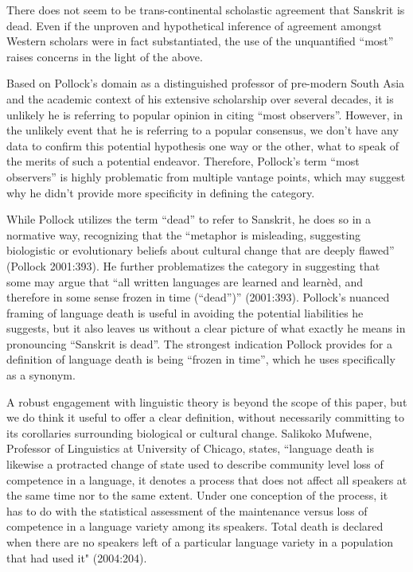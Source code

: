 There does not seem to be trans-continental scholastic agreement that Sanskrit is dead. Even if the unproven and hypothetical inference of agreement amongst Western scholars were in fact substantiated, the use of the unquantified “most” raises concerns in the light of the above. 

Based on Pollock’s domain as a distinguished professor of pre-modern South Asia and the academic context of his extensive scholarship over several decades, it is unlikely he is referring to popular opinion in citing “most observers”. However, in the unlikely event that he is referring to a popular consensus, we don’t have any data to confirm this potential hypothesis one way or the other, what to speak of the merits of such a potential endeavor. Therefore, Pollock’s term “most observers” is highly problematic from multiple vantage points, which may suggest why he didn’t provide more specificity in defining the category. 

While Pollock utilizes the term “dead” to refer to Sanskrit, he does so in a normative way, recognizing that the “metaphor is misleading, suggesting biologistic or evolutionary beliefs about cultural change that are deeply flawed” (Pollock 2001:393). He further problematizes the category in suggesting that some may argue that “all written languages are learned and learnèd, and therefore in some sense frozen in time (“dead”)” (2001:393). Pollock’s nuanced framing of language death is useful in avoiding the potential liabilities he suggests, but it also leaves us without a clear picture of what exactly he means in pronouncing “Sanskrit is dead”. The strongest indication Pollock provides for a definition of language death is being  “frozen in time”, which he uses specifically as a synonym. 

A robust engagement with linguistic theory is beyond the scope of this paper, but we do think it useful to offer a clear definition, without necessarily committing to its corollaries surrounding biological or cultural change. Salikoko Mufwene, Professor of Linguistics at University of Chicago, states, ``language death is likewise a protracted change of state used to describe community level loss of competence in a language, it denotes a process that does not affect all speakers at the same time nor to the same extent. Under one conception of the process, it has to do with the statistical assessment of the maintenance versus loss of competence in a language variety among its speakers. Total death is declared when there are no speakers left of a particular language variety in a population that had used it" (2004:204). 

